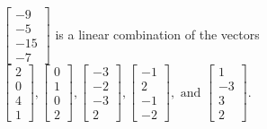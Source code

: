 \begin{exercise}
\begin{exerciseStatement}
  \end{exerciseStatement}
  \begin{exerciseAnswer}
   \(\left[\begin{array}{c}
-9 \\
-5 \\
-15 \\
-7
\end{array}\right]\) 
  	 is  
	a linear combination of the vectors \(\left[\begin{array}{c}
2 \\
0 \\
4 \\
1
\end{array}\right] , \left[\begin{array}{c}
0 \\
1 \\
0 \\
2
\end{array}\right] , \left[\begin{array}{c}
-3 \\
-2 \\
-3 \\
2
\end{array}\right] , \left[\begin{array}{c}
-1 \\
2 \\
-1 \\
-2
\end{array}\right] , \text{ and } \left[\begin{array}{c}
1 \\
-3 \\
3 \\
2
\end{array}\right]\).

	
  


  \end{exerciseAnswer}
\end{exercise}